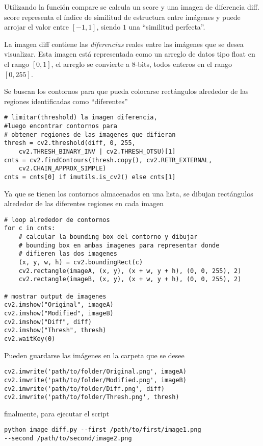 \documentclass[a4paper,openright,10pt, oneside, final]{book}
\begin{document}
Utilizando la función \textsf{compare} se calcula un \textsf{score} y una imagen de diferencia \textsf{diff}. \textsf{score} representa el índice de similitud de estructura entre imágenes y puede arrojar el valor entre $[-1,1]$, siendo $1$ una ``similitud perfecta''.

La imagen \textsf{diff} contiene las \textit{diferencias} reales entre las imágenes que se desea visualizar. Esta imagen está representada como un arreglo de datos tipo \textsf{float} en el rango $[0,1]$, el arreglo se convierte a 8-bits, todos enteros en el rango $[0,255]$. 

Se buscan los contornos para que pueda colocarse rectángulos alrededor de las regiones identificadas como ``diferentes''
\begin{verbatim}
# limitar(threshold) la imagen diferencia, 
#luego encontrar contornos para
# obtener regiones de las imagenes que difieran
thresh = cv2.threshold(diff, 0, 255,
	cv2.THRESH_BINARY_INV | cv2.THRESH_OTSU)[1]
cnts = cv2.findContours(thresh.copy(), cv2.RETR_EXTERNAL,
	cv2.CHAIN_APPROX_SIMPLE)
cnts = cnts[0] if imutils.is_cv2() else cnts[1]
\end{verbatim}

Ya que se tienen los contornos almacenados en una lista, se dibujan rectángulos alrededor de las diferentes regiones en cada imagen
\begin{verbatim}
# loop alrededor de contornos
for c in cnts:
	# calcular la bounding box del contorno y dibujar 
	# bounding box en ambas imagenes para representar donde 
	# difieren las dos imagenes
	(x, y, w, h) = cv2.boundingRect(c)
	cv2.rectangle(imageA, (x, y), (x + w, y + h), (0, 0, 255), 2)
	cv2.rectangle(imageB, (x, y), (x + w, y + h), (0, 0, 255), 2)
 
# mostrar output de imagenes
cv2.imshow("Original", imageA)
cv2.imshow("Modified", imageB)
cv2.imshow("Diff", diff)
cv2.imshow("Thresh", thresh)
cv2.waitKey(0)
\end{verbatim}

Pueden guardarse las imágenes en la carpeta que se desee
\begin{verbatim}
cv2.imwrite('path/to/folder/Original.png', imageA)
cv2.imwrite('path/to/folder/Modified.png', imageB)
cv2.imwrite('path/to/folder/Diff.png', diff)
cv2.imwrite('path/to/folder/Thresh.png', thresh)
\end{verbatim}

finalmente, para ejecutar el script
\begin{verbatim}
python image_diff.py --first /path/to/first/image1.png
--second /path/to/second/image2.png
\end{verbatim}
\end{document}
